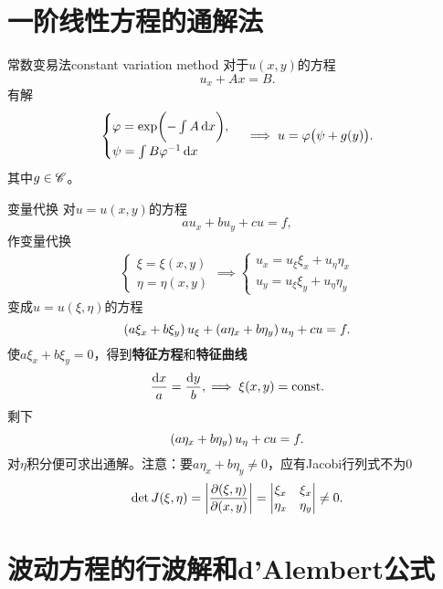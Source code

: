 \section{一阶线性方程的通解法}
\begin{method}{常数变易法}{constant variation method}
	对于$u(x,y)$的方程
	\[
		u_x+Ax=B.
	\]
	有解
	\begin{align*}
		\begin{cases}
			\varphi=\exp\biggl(-\int A\mathop{}\!\mathrm{d} x\biggr),  \\
			\psi=\int B\varphi^{-1}\mathop{}\!\mathrm{d} x
		\end{cases}
		\implies u=\varphi\bigl(\psi+g(y)\bigr).
	\end{align*}
	其中$g\in\mathscr C$。
\end{method}
\begin{method}{变量代换}
	对$u=u(x,y)$的方程
	\[
		au_x+bu_y+cu=f,
	\]
	作变量代换
	\begin{align*}
		\begin{cases}
			\xi=\xi(x,y)  \\
			\eta=\eta(x,y)
		\end{cases}
		\implies
		\begin{cases}
			u_x=u_\xi\xi_x+u_\eta\eta_x \\
			u_y=u_\xi\xi_y+u_\eta\eta_y
		\end{cases}
	\end{align*}
	变成$u=u(\xi,\eta)$的方程
	\[
		\left(a\xi_x+b\xi_y\right)u_\xi+\left(a\eta_x+b\eta_y\right)u_\eta+cu=f.
	\]
	使$a\xi_x+b\xi_y=0$，得到\textbf{特征方程}和\textbf{特征曲线}
	\begin{align}
		\frac{\mathop{}\!\mathrm{d} x}a=\frac{\mathop{}\!\mathrm{d} y}b,\implies\xi(x,y)=\text{const}.
	\end{align}
	剩下
	\[
		\left(a\eta_x+b\eta_y\right)u_\eta+cu=f.
	\]
	对$\eta$积分便可求出通解。注意：要$a\eta_x+b\eta_y\neq 0$，应有Jacobi行列式不为0
	\begin{align*}
		\det J(\xi,\eta)=\left\lvert\frac{\partial(\xi,\eta)}{\partial(x,y)}\right\rvert=
		\begin{vmatrix}
			\xi_x  & \xi_x  \\
			\eta_x & \eta_y
		\end{vmatrix}\neq 0.
	\end{align*}
\end{method}

\section{波动方程的行波解和d'Alembert公式}


